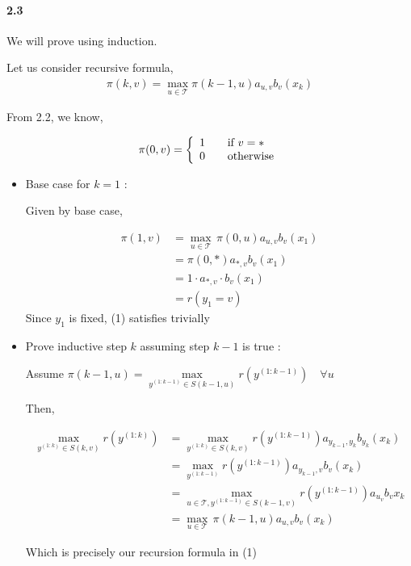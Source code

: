 \documentclass[10pt,letter]{article}
\begin{document}
\paragraph*{2.3}

We will prove using induction.


Let us consider recursive formula,
\begin{align}
\pi(k,v) = \max_{u\in\mathcal{T}}\pi(k-1,u)a_{u,v}b_v(x_k)
\end{align}

From 2.2, we know,

\begin{align*} 
\pi(0,v) = \left\{ 
\begin{array}{l l}
1 & \quad \text{if $v=*$}\\
0 & \quad \text{otherwise}
\end{array} \right.
\end{align*}

\begin{itemize}
	\item Base case for $k=1$ :
	
	Given by base case,
	
	\begin{align*}
	\pi(1,v) &= \max_{u\in\mathcal{T}}\, \pi(0,u)a_{u,v}b_v(x_1) \\
	&= \pi(0,*)a_{*,v}b_v(x_1) \\
	&= 1\cdot a_{*,v} \cdot b_v(x_1) \\
	&= r(y_1=v)
	\end{align*}
	Since $y_1$ is fixed, (1) satisfies trivially
	
	\item Prove inductive step $k$ assuming step $k-1$ is true :
	
	
	Assume $\pi(k-1,u) = \max\limits_{ y^{(1:k-1)}\in S(k-1,u) } r( y^{(1:k-1)})   \quad \forall u$
	
	Then, 
	
	\begin{align*}
	\max\limits_{y^{(1:k)}\in S(k,v)}r(y^{(1:k)}) 
	&=\max\limits_{y^{(1:k)}\in S(k,v)}r(y^{(1:k-1)})a_{y_{k-1},y_k}b_{y_k}(x_k) \\
	&= \max_{y^{(1:k-1)}}r( y^{(1:k-1)} )a_{y_{k-1},v}b_{v}(x_k) \\
	&= \max\limits_{u\in\mathcal{T}, y^{(1:k-1)}\in S(k-1,v)} r(y^{(1:k-1)})a_{u_v}b_v{x_k} \\
	&= \max\limits_{u\in\mathcal{T}}\, \pi(k-1,u)a_{u,v}b_v(x_k) 
	\end{align*}

	Which is precisely our recursion formula in (1)
	
\end{itemize} 
\end{document}
